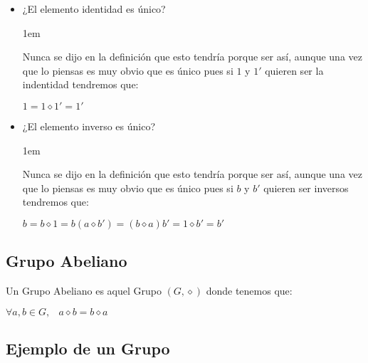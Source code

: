 \documentclass[12pt, fleqn]{report}                             %
\newenvironment{SmallIndentation}[1][0.75em]                    %
        {\begin{adjustwidth}{#1}{}\begin{footnotesize}}             %
        {\end{footnotesize}\end{adjustwidth}}                       %
\DeclareMathOperator \Space     {\quad}                         %
\DeclareMathOperator \MiniSpace {\;}                            %
\theoremstyle{break}                                            %
\begin{document}
                \begin{itemize}
                    \item ¿El elemento identidad es único?

                    \begin{SmallIndentation}[1em]
                        Nunca se dijo en la definición que esto tendría porque ser
                        así, aunque una vez que lo piensas es muy obvio que es único
                        pues si $1$ y $1'$ quieren ser la indentidad tendremos que:

                        $1 = 1 \diamond 1' = 1'$
                    \end{SmallIndentation}

                    \item ¿El elemento inverso es único?

                    \begin{SmallIndentation}[1em]
                        Nunca se dijo en la definición que esto tendría porque ser
                        así, aunque una vez que lo piensas es muy obvio que es único
                        pues si $b$ y $b'$ quieren ser inversos tendremos que:

                        $b = b \diamond 1 = b (a \diamond b') = (b \diamond a) b' = 1 \diamond b' = b'$
                    \end{SmallIndentation}
                \end{itemize}




            \clearpage
            \subsection{Grupo Abeliano}

                Un Grupo Abeliano es aquel Grupo $(G, \diamond)$ donde tenemos que:

                $\forall a, b \in G, \MiniSpace a \diamond b = b \diamond a$


            \subsection{Ejemplo de un Grupo}
\end{document}
